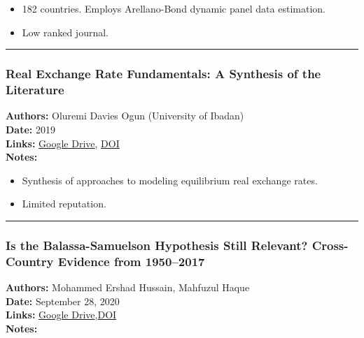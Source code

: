 \documentclass[
  11pt,
]{article}
\providecommand{\tightlist}{%
  \setlength{\itemsep}{0pt}\setlength{\parskip}{0pt}}
\begin{document}
\begin{itemize}
\tightlist
\item
  182 countries. Employs Arellano-Bond dynamic panel data estimation.
\item
  Low ranked journal.
\end{itemize}

\begin{center}\rule{0.5\linewidth}{0.5pt}\end{center}

\subsubsection{Real Exchange Rate Fundamentals: A Synthesis of the
Literature}\label{real-exchange-rate-fundamentals-a-synthesis-of-the-literature}

\textbf{Authors:} Oluremi Davies Ogun (University of Ibadan)\\
\textbf{Date:} 2019\\
\textbf{Links:}
\href{https://drive.google.com/file/d/1SIhMMtsybhiY3eJg-oGcCAvoqJPDKXtQ/view?usp=sharing}{Google
Drive}, \href{https://doi.org/10.6000/1929-7092.2019.08.36}{DOI}\\
\textbf{Notes:}

\begin{itemize}
\tightlist
\item
  Synthesis of approaches to modeling equilibrium real exchange rates.
\item
  Limited reputation.
\end{itemize}

\begin{center}\rule{0.5\linewidth}{0.5pt}\end{center}

\subsubsection{Is the Balassa-Samuelson Hypothesis Still Relevant?
Cross-Country Evidence from
1950--2017}\label{is-the-balassa-samuelson-hypothesis-still-relevant-cross-country-evidence-from-19502017-1}

\textbf{Authors:} Mohammed Ershad Hussain, Mahfuzul Haque\\
\textbf{Date:} September 28, 2020\\
\textbf{Links:}
\href{https://drive.google.com/file/d/1UOk4LsRAddTO--0tr4ulynOaXQht7Agv/view?usp=sharing}{Google
Drive},\href{https://doi.org/10.1453/jepe.v7i3.2096}{DOI}\\
\textbf{Notes:}
\end{document}
